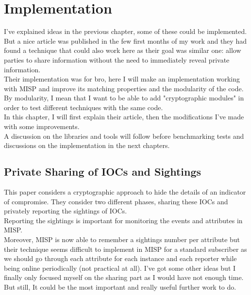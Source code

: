 \documentclass{eplmastersthesis}
\begin{document}
\chapter{Implementation}
I've explained ideas in the previous chapter, some of these could be implemented. But a nice article \cite{van2016private} was published in the few first months of my work and they had found a technique that could also work here as their goal was similar one: allow parties to share information without the need to immediately reveal private information.\\
Their implementation was for bro, here I will make an implementation working with MISP and improve its matching properties and the modularity of the code. \\
By modularity, I mean that I want to be able to add "cryptographic modules" in order to test different techniques with the same code.\\
In this chapter, I will first explain their article, then the modifications I've made with some improvements.\\
A discussion on the libraries and tools will follow before benchmarking tests and discussions on the implementation in the next chapters.

\section{Private Sharing of IOCs and Sightings \cite{van2016private}}
This paper considers a cryptographic approach to hide the details of an indicator of compromise. They consider two different phases, sharing these IOCs and privately reporting the sightings of IOCs.\\

Reporting the sightings is important for monitoring the events and attributes in MISP.\\ 
Moreover, MISP is now able to remember a sightings number per attribute but their technique seems difficult to implement in MISP for a standard subscriber as we should go through each attribute for each instance and each reporter while being online periodically (not practical at all). I've got some other ideas but I finally only focused myself on the sharing part as I would have not enough time.\\ 
But still, It could be the most important and really useful further work to do.\\
\end{document}
